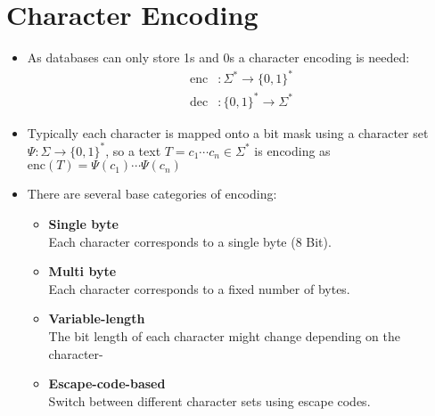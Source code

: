     \section{Character Encoding} %
        \begin{itemize}
        	\item As databases can only store 1s and 0s a character encoding is needed:
        		\begin{align*}
        			\text{enc} & : \Sigma^* \rightarrow \{ 0, 1 \}^* \tag{Encoding} \\
        			\text{dec} & : \{ 0, 1 \}^* \rightarrow \Sigma^* \tag{Decoding}
        		\end{align*}
        	\item Typically each character is mapped onto a bit mask using a character set \( \Psi : \Sigma \rightarrow \{ 0, 1 \}^* \), so a text \( T = c_1 \cdots c_n \in \Sigma^* \) is encoding as \( \text{enc}(T) = \Psi(c_1)\cdots\Psi(c_n) \)
        	\item There are several base categories of encoding:
        		\begin{itemize}
        			\item \textbf{Single byte} \\ Each character corresponds to a single byte (8 Bit).
        			\item \textbf{Multi byte} \\ Each character corresponds to a fixed number of bytes.
        			\item \textbf{Variable-length} \\ The bit length of each character might change depending on the character-
        			\item \textbf{Escape-code-based} \\ Switch between different character sets using escape codes.
        		\end{itemize}
        \end{itemize}

